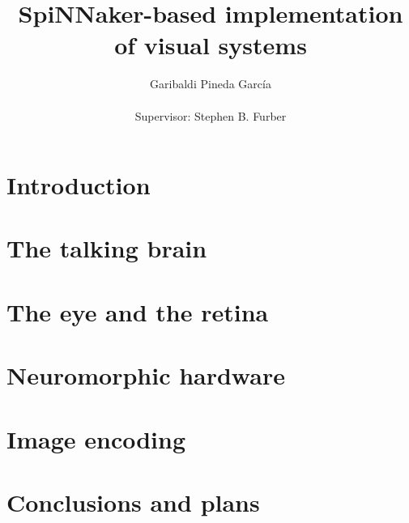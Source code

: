 \documentclass[12pt,a4paper,oneside]{report}
\title{SpiNNaker-based implementation of visual systems}
\author{Garibaldi Pineda Garc\'ia \\ \\ Supervisor: Stephen B. Furber}
\date{}
\begin{document}
\begingroup
\renewcommand{\newpage}{}
\maketitle

\endgroup

\begingroup
\let\cleardoublepage\clearpage
\tableofcontents
\endgroup

\chapter{Introduction}

\chapter{The talking brain}

\chapter{The eye and the retina}

\chapter{Neuromorphic hardware}

\chapter{Image encoding}

\chapter{Conclusions and plans}




\end{document}
